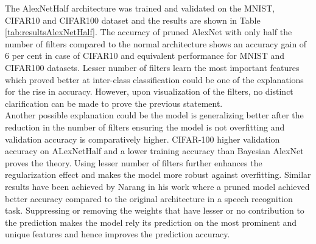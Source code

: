 The AlexNetHalf architecture was trained and validated on the MNIST, CIFAR10 and CIFAR100 dataset and the results are shown in Table \ref{tab:resultsAlexNetHalf}. The accuracy of pruned AlexNet with only half the number of filters compared to the normal architecture shows an accuracy gain of 6 per cent in case of CIFAR10 and equivalent performance for MNIST and CIFAR100 datasets. Lesser number of filters learn the most important features which proved better at inter-class classification could be one of the explanations for the rise in accuracy. However, upon visualization of the filters, no distinct clarification can be made to prove the previous statement. \\ 
Another possible explanation could be the model is generalizing better after the reduction in the number of filters ensuring the model is not overfitting and validation accuracy is comparatively higher. CIFAR-100 higher validation accuracy on ALexNetHalf and a lower training accuracy than Bayesian AlexNet proves the theory. Using lesser number of filters further enhances the regularization effect and makes the model more robust against overfitting. Similar results have been achieved by Narang \cite{DBLP:journals/corr/NarangDSE17} in his work where a pruned model achieved better accuracy compared to the original architecture in a speech recognition task. Suppressing or removing the weights that have lesser or no contribution to the prediction makes the model rely its prediction on the most prominent and unique features and hence improves the prediction accuracy.

\begin{table}[H]
\tiny
    \centering
    \renewcommand{\arraystretch}{1.5}
    \renewcommand{\arraystretch}{1.5}
    \caption{Comparison of validation accuracies (in percentage) for AlexNet with variational inference (VI), AlexNet with frequentist inference and AlexNet with half number of filters halved for MNIST, CIFAR-10 and CIFAR-100 datasets.}
    \label{tab:resultsAlexNetHalf}
\end{table}

